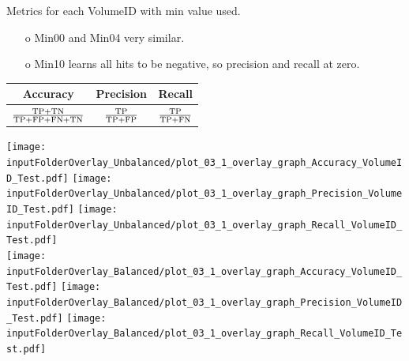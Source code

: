 \documentclass{beamer}
\begin{document}
\begin{frame}{Metrics for each VolumeID with min value used.}
\begin{enumerate}
\item[o] Min00 and Min04 very similar. 
\item[o] Min10 learns all hits to be negative, so precision and recall at zero.
\end{enumerate}
\centering
\begin{center}
\begin{tabular}{ |c|c|c| } 
\hline
Accuracy & Precision & Recall \\ 
\hline
$\frac{\TP+\TN}{\TP+\FP+\FN+\TN}$ & $\frac{\TP}{\TP+\FP}$  & $\frac{\TP}{\TP+\FN}$ \\ 
\hline
\end{tabular}
\end{center}
\texttt{[image: \\inputFolderOverlay\_Unbalanced/plot\_03\_1\_overlay\_graph\_Accuracy\_VolumeID\_Test.pdf]}
\texttt{[image: \\inputFolderOverlay\_Unbalanced/plot\_03\_1\_overlay\_graph\_Precision\_VolumeID\_Test.pdf]}
\texttt{[image: \\inputFolderOverlay\_Unbalanced/plot\_03\_1\_overlay\_graph\_Recall\_VolumeID\_Test.pdf]}\\
\texttt{[image: \\inputFolderOverlay\_Balanced/plot\_03\_1\_overlay\_graph\_Accuracy\_VolumeID\_Test.pdf]}
\texttt{[image: \\inputFolderOverlay\_Balanced/plot\_03\_1\_overlay\_graph\_Precision\_VolumeID\_Test.pdf]}
\texttt{[image: \\inputFolderOverlay\_Balanced/plot\_03\_1\_overlay\_graph\_Recall\_VolumeID\_Test.pdf]}\\
\end{frame}
\end{document}
